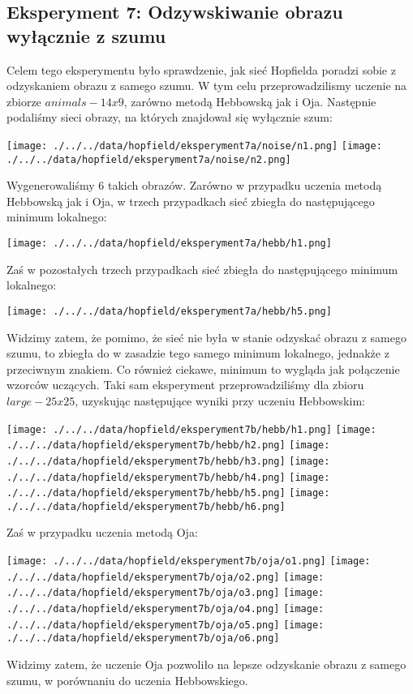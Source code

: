 \documentclass{article}
\begin{document}
\subsection{Eksperyment 7: Odzywskiwanie obrazu wyłącznie z szumu}
Celem tego eksperymentu było sprawdzenie, jak sieć Hopfielda poradzi sobie z odzyskaniem obrazu z samego szumu.
W tym celu przeprowadzilismy uczenie na zbiorze $animals-14x9$, zarówno metodą Hebbowską jak i Oja.
Następnie podaliśmy sieci obrazy, na których znajdował się wyłącznie szum:
\begin{center}
    \texttt{[image: ./../../data/hopfield/eksperyment7a/noise/n1.png]}
    \texttt{[image: ./../../data/hopfield/eksperyment7a/noise/n2.png]}
\end{center}
Wygenerowaliśmy $6$ takich obrazów. Zarówno w przypadku uczenia metodą Hebbowską jak i Oja,
 w trzech przypadkach sieć zbiegła do następującego minimum lokalnego:
\begin{center}
    \texttt{[image: ./../../data/hopfield/eksperyment7a/hebb/h1.png]}
\end{center}
Zaś w pozostałych trzech przypadkach sieć zbiegła do następującego minimum lokalnego:
\begin{center}
    \texttt{[image: ./../../data/hopfield/eksperyment7a/hebb/h5.png]}
\end{center}
Widzimy zatem, że pomimo, że sieć nie była w stanie odzyskać obrazu z samego szumu, to zbiegła do 
w zasadzie tego samego minimum lokalnego, jednakże z przeciwnym znakiem.
Co również ciekawe, minimum to wygląda jak połączenie wzorców uczących.
Taki sam eksperyment przeprowadziliśmy dla zbioru $large-25x25$, uzyskując następujące wyniki przy uczeniu Hebbowskim:
\begin{center}
    \texttt{[image: ./../../data/hopfield/eksperyment7b/hebb/h1.png]}
    \texttt{[image: ./../../data/hopfield/eksperyment7b/hebb/h2.png]}
    \texttt{[image: ./../../data/hopfield/eksperyment7b/hebb/h3.png]}
    \texttt{[image: ./../../data/hopfield/eksperyment7b/hebb/h4.png]}
    \texttt{[image: ./../../data/hopfield/eksperyment7b/hebb/h5.png]}
    \texttt{[image: ./../../data/hopfield/eksperyment7b/hebb/h6.png]}
\end{center}
Zaś w przypadku uczenia metodą Oja:
\begin{center}
    \texttt{[image: ./../../data/hopfield/eksperyment7b/oja/o1.png]}
    \texttt{[image: ./../../data/hopfield/eksperyment7b/oja/o2.png]}
    \texttt{[image: ./../../data/hopfield/eksperyment7b/oja/o3.png]}
    \texttt{[image: ./../../data/hopfield/eksperyment7b/oja/o4.png]}
    \texttt{[image: ./../../data/hopfield/eksperyment7b/oja/o5.png]}
    \texttt{[image: ./../../data/hopfield/eksperyment7b/oja/o6.png]}
\end{center}
Widzimy zatem, że uczenie Oja pozwoliło na lepsze odzyskanie obrazu z samego szumu,
w porównaniu do uczenia Hebbowskiego. 
\end{document}
